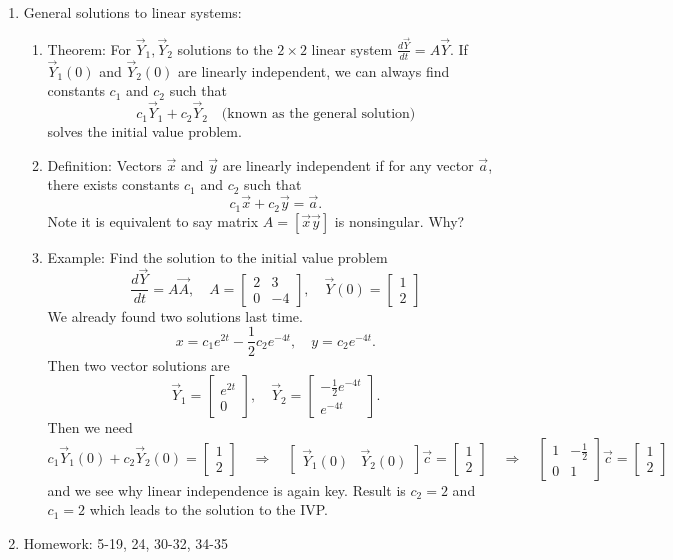 \documentclass{article}
\begin{document}
\begin{enumerate}
\item General solutions to linear systems:
\begin{enumerate}
\item Theorem: For $\vec{Y}_1, \vec{Y}_2$ solutions to the $2 \times 2$ linear system $\frac{d\vec{Y}}{dt} = A\vec{Y}$. If $\vec{Y}_1(0)$ and $\vec{Y}_2(0)$ are linearly independent, we can always find constants $c_1$ and $c_2$ such that 
\[
c_1 \vec{Y}_1 + c_2 \vec{Y}_2 \quad \text{(known as the general solution)}
\]
solves the initial value problem. 
\item Definition: Vectors $\vec{x}$ and $\vec{y}$ are linearly independent if for any vector $\vec{a}$, there exists constants $c_1$ and $c_2$ such that
\[
c_1 \vec{x} + c_2 \vec{y} = \vec{a}.
\]
Note it is equivalent to say matrix $A = \left[ \vec{x} \vec{y} \right]$ is nonsingular. Why?
\item Example: Find the solution to the initial value problem
\[
\frac{d\vec{Y}}{dt} = A \vec{A}, \quad 
A = 
\begin{bmatrix}
2 & 3 \\
0 & -4
\end{bmatrix}, \quad \vec{Y}(0) = 
\begin{bmatrix}
1 \\
2
\end{bmatrix}
\]
We already found two solutions last time.
\[
x = c_1 e^{2t} - \frac{1}{2} c_2 e^{-4t}, \quad y = c_2 e^{-4t}.
\]
Then two vector solutions are
\[
\vec{Y}_1 = 
\begin{bmatrix}
e^{2t} \\
0
\end{bmatrix}, \quad
\vec{Y}_2 = 
\begin{bmatrix}
-\frac{1}{2}e^{-4t} \\
e^{-4t} 
\end{bmatrix}.
\]
Then we need
\[
c_1\vec{Y}_1(0) + c_2\vec{Y}_2(0) = 
\begin{bmatrix}
1 \\
2
\end{bmatrix}
\quad \Rightarrow \quad
\begin{bmatrix}
\vec{Y}_1(0) & \vec{Y}_2(0) 
\end{bmatrix}
\vec{c} = 
\begin{bmatrix}
1 \\
2
\end{bmatrix}
\quad \Rightarrow \quad
\begin{bmatrix}
1 & -\frac{1}{2} \\
0 & 1
\end{bmatrix}
\vec{c} = 
\begin{bmatrix}
1 \\
2
\end{bmatrix}
\]
and we see why linear independence is again key. Result is $c_2 = 2$ and $c_1=2$ which leads to the solution to the IVP.
\end{enumerate}

\item Homework: 5-19, 24, 30-32, 34-35

\end{enumerate}
\end{document}
